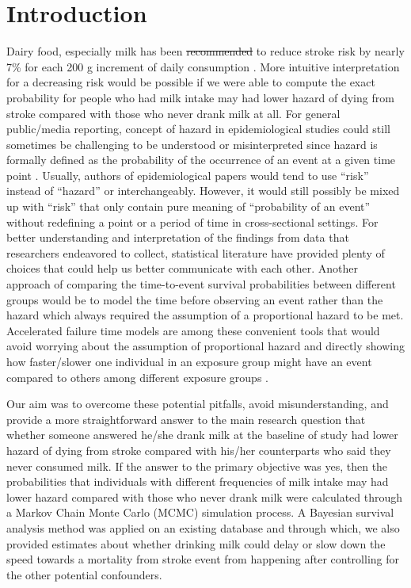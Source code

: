 \documentclass[nutrients,article,submitted,moreauthors,pdftex]{mdpi}
\providecommand{\DIFadd}[1]{{\protect\color{blue}\uwave{#1}}} %
\providecommand{\DIFdel}[1]{{\protect\color{red}\sout{#1}}}                      %
\providecommand{\DIFaddbegin}{} %
\providecommand{\DIFaddend}{} %
\providecommand{\DIFdelbegin}{} %
\providecommand{\DIFdelend}{} %
\newcommand{\DIFscaledelfig}{0.5}
\newlength{\DIFdelgraphicswidth} %
\newlength{\DIFdelgraphicsheight} %
\newcommand{\DIFaddincludegraphics}[2][]{{\color{blue}\fbox{\DIFOincludegraphics[#1]{#2}}}} %
\newcommand{\DIFdelincludegraphics}[2][]{%
\sbox{\DIFdelgraphicsbox}{\DIFOincludegraphics[#1]{#2}}%
\settoboxwidth{\DIFdelgraphicswidth}{\DIFdelgraphicsbox} %
\settoboxtotalheight{\DIFdelgraphicsheight}{\DIFdelgraphicsbox} %
\scalebox{\DIFscaledelfig}{%
\parbox[b]{\DIFdelgraphicswidth}{\usebox{\DIFdelgraphicsbox}\\[-\baselineskip] \rule{\DIFdelgraphicswidth}{0em}}\llap{\resizebox{\DIFdelgraphicswidth}{\DIFdelgraphicsheight}{%
\setlength{\unitlength}{\DIFdelgraphicswidth}%
\begin{picture}(1,1)%
\thicklines\linethickness{2pt} %
{\color[rgb]{1,0,0}\put(0,0){\framebox(1,1){}}}%
{\color[rgb]{1,0,0}\put(0,0){\line( 1,1){1}}}%
{\color[rgb]{1,0,0}\put(0,1){\line(1,-1){1}}}%
\end{picture}%
}\hspace*{3pt}}} %
} %
\DeclareRobustCommand{\DIFaddbegin}{\DIFOaddbegin \let\includegraphics\DIFaddincludegraphics} %
\DeclareRobustCommand{\DIFaddend}{\DIFOaddend \let\includegraphics\DIFOincludegraphics} %
\DeclareRobustCommand{\DIFdelbegin}{\DIFOdelbegin \let\includegraphics\DIFdelincludegraphics} %
\DeclareRobustCommand{\DIFdelend}{\DIFOaddend \let\includegraphics\DIFOincludegraphics} %
\begin{document}

\hypertarget{introduction}{%
\section{Introduction}\label{introduction}}

Dairy food, especially milk has been \DIFdelbegin \DIFdel{recommended }\DIFdelend \DIFaddbegin \DIFadd{suggested }\DIFaddend to reduce stroke risk by
nearly 7\% for each 200 g increment of daily consumption
\citep{DeGoede2016}. More intuitive interpretation for a decreasing risk
would be possible if we were able to compute the exact probability for
people who had milk intake may had lower hazard of dying from stroke
compared with those who never drank milk at all. For general
public/media reporting, concept of hazard in epidemiological studies
could still sometimes be challenging to be understood or misinterpreted
since hazard is formally defined as the probability of the occurrence of
an event at a given time point \citep{collett2015modelling}. Usually,
authors of epidemiological papers would tend to use ``risk'' instead of
``hazard'' or interchangeably. However, it would still possibly be mixed
up with ``risk'' that only contain pure meaning of ``probability of an
event'' without redefining a point or a period of time in
cross-sectional settings. For better understanding and interpretation of
the findings from data that researchers endeavored to collect,
statistical literature have provided plenty of choices that could help
us better communicate with each other. Another approach of comparing the
time-to-event survival probabilities between different groups would be
to model the time before observing an event rather than the hazard which
always required the assumption of a proportional hazard to be met.
Accelerated failure time models are among these convenient tools that
would avoid worrying about the assumption of proportional hazard and
directly showing how faster/slower one individual in an exposure group
might have an event compared to others among different exposure groups
\citep{Wei1992}.

Our aim was to overcome these potential pitfalls, avoid
misunderstanding, and provide a more straightforward answer to the main
research question that whether someone answered he/she drank milk at the
baseline of study had lower hazard of dying from stroke compared with
his/her counterparts who said they never consumed milk. If the answer to
the primary objective was yes, then the probabilities that individuals
with different frequencies of milk intake may had lower hazard compared
with those who never drank milk were calculated through a Markov Chain
Monte Carlo (MCMC) simulation process. A Bayesian survival analysis
method was applied on an existing database and through which, we also
provided estimates about whether drinking milk could delay or slow down
the speed towards a mortality from stroke event from happening after
controlling for the other potential confounders.
\end{document}
